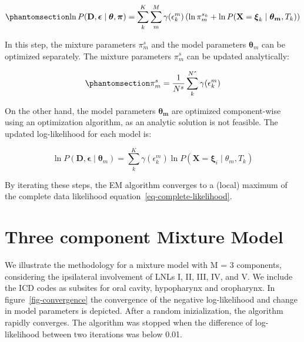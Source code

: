 \documentclass[
  sn-mathphys-num,
]{sn-jnl}
\begin{document}
\begin{equation}\phantomsection\label{eq-maximization-step}{
\ln P(\mathbf{D}, \boldsymbol{\epsilon} \mid \boldsymbol{\theta}, \boldsymbol{\pi}) = \sum_k^K \sum_{m}^M \gamma(\epsilon^m_{k}) \left( \ln \pi_m^{s_k} + \ln P(\mathbf{X} = \boldsymbol{\xi}_k \mid \boldsymbol{\theta_m}, T_k) \right)
}\end{equation}

In this step, the mixture parameters \(\pi_m^s\) and the model
parameters \(\boldsymbol{\theta}_m\) can be optimized separately. The
mixture parameters \(\pi_m^s\) can be updated analytically:

\begin{equation}\phantomsection\label{eq-mixture-maximization}{
\pi_m^s = \frac{1}{N^s} \sum_k^{N^s} \gamma(\epsilon^m_k)
}\end{equation}

On the other hand, the model parameters \(\boldsymbol{\theta_m}\) are
optimized component-wise using an optimization algorithm, as an analytic
solution is not feasible. The updated log-likelihood for each model is:

\[
\ln P(\mathbf{D}, \boldsymbol{\epsilon} \mid \boldsymbol{\theta}_m) = \sum_{k}^K \gamma(\epsilon^m_{k}) \ln P(\mathbf{X} = \boldsymbol{\xi}_i \mid \theta_m, T_k)
\]

By iterating these steps, the EM algorithm converges to a (local)
maximum of the complete data likelihood
equation~\ref{eq-complete-likelihood}.

\section{Three component Mixture Model}\label{sec-3comp}

We illustrate the methodology for a mixture model with M = 3 components,
considering the ipsilateral involvement of LNLs I, II, III, IV, and V.
We include the ICD codes as subsites for oral cavity, hypopharynx and
oropharynx. In figure~\ref{fig-convergence} the convergence of the
negative log-likelihood and change in model parameters is depicted.
After a random inizialization, the algorithm rapidly converges. The
algorithm was stopped when the difference of log-likelihood between two
iterations was below 0.01.
\end{document}
